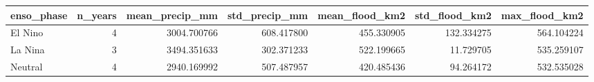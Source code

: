 \begin{tabular}{lrrrrrr}
\toprule
enso\_phase & n\_years & mean\_precip\_mm & std\_precip\_mm & mean\_flood\_km2 & std\_flood\_km2 & max\_flood\_km2 \\
\midrule
El Nino & 4 & 3004.700766 & 608.417800 & 455.330905 & 132.334275 & 564.104224 \\
La Nina & 3 & 3494.351633 & 302.371233 & 522.199665 & 11.729705 & 535.259107 \\
Neutral & 4 & 2940.169992 & 507.487957 & 420.485436 & 94.264172 & 532.535028 \\
\bottomrule
\end{tabular}
